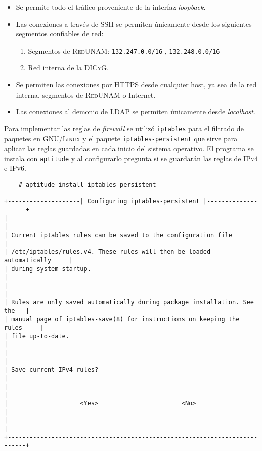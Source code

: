 \begin{itemize}
  \item Se permite todo el tr\'{a}fico proveniente de la interfaz \textit{loopback}.
  \item Las conexiones a trav\'{e}s de \textsc{SSH} se permiten \'{u}nicamente desde los siguientes segmentos confiables de red:
  \begin{enumerate}
    \item Segmentos de \textsc{RedUNAM}: \texttt{132.247.0.0/16} , \texttt{132.248.0.0/16}
    \item Red interna de la \textsc{DICyG}.
  \end{enumerate}
  \item Se permiten las conexiones por \textsc{HTTPS} desde cualquier host, ya sea de la red interna, segmentos de \textsc{RedUNAM} o Internet.
  \item Las conexiones al demonio de \textsc{LDAP} se permiten \'{u}nicamente desde \textit{localhost}.
\end{itemize}

Para implementar las reglas de \textit{firewall} se utiliz\'{o} \texttt{iptables} para el filtrado de paquetes en \textsc{GNU/Linux} y el paquete \texttt{iptables-persistent} que sirve para aplicar las reglas guardadas en cada inicio del sistema operativo. El programa se instala con \texttt{aptitude} y al configurarlo pregunta si se guardar\'{a}n las reglas de \textsc{IPv4} e \textsc{IPv6}.

{
\scriptsize
\linespread{1}
\begin{verbatim}
    # aptitude install iptables-persistent

+--------------------| Configuring iptables-persistent |--------------------+
|                                                                           |
| Current iptables rules can be saved to the configuration file             |
| /etc/iptables/rules.v4. These rules will then be loaded automatically     |
| during system startup.                                                    |
|                                                                           |
| Rules are only saved automatically during package installation. See the   |
| manual page of iptables-save(8) for instructions on keeping the rules     |
| file up-to-date.                                                          |
|                                                                           |
| Save current IPv4 rules?                                                  |
|                                                                           |
|                    <Yes>                       <No>                       |
|                                                                           |
+---------------------------------------------------------------------------+
\end{verbatim}
}

